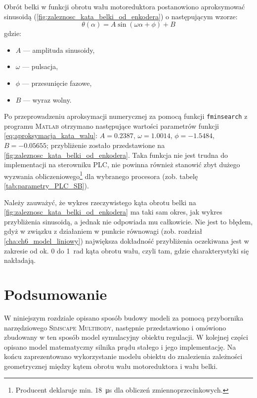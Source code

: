 Obrót belki w funkcji obrotu wału motoreduktora postanowiono aproksymować sinusoidą (\cref{fig:zaleznosc_kata_belki_od_enkodera}) o następującym wzorze:
\begin{equation}\label{eq:aproksymacja_kata_walu}
    \theta(\alpha) = A \sin (\omega \alpha + \phi) + B
\end{equation}
gdzie:
\begin{itemize}
    \item $A$ --- amplituda sinusoidy,
    \item $\omega$ --- pulsacja,
    \item $\phi$ --- przesunięcie fazowe,
    \item $B$ --- wyraz wolny.
\end{itemize}

Po przeprowadzeniu aproksymacji numerycznej za pomocą funkcji \texttt{fminsearch} z programu \textsc{Mat\-lab} otrzymano następujące wartości parametrów funkcji \eqref{eq:aproksymacja_kata_walu}: $A = \num{0.2387}$, $\omega = \num{1.0014}$, $\phi = \num{-1.5484}$, $B = \num{-0.05655}$; przybliżenie zostało przedstawione na \cref{fig:zaleznosc_kata_belki_od_enkodera}. Taka funkcja nie jest trudna do implementacji na sterowniku PLC, nie powinna również stanowić zbyt dużego wyzwania obliczeniowego\footnote{Producent deklaruje min. \SI{18}{\micro\second} dla obliczeń zmiennoprzecinkowych.} dla wybranego procesora (zob. tabelę \ref{tab:parametry_PLC_SB}).

Należy zauważyć, że wykres rzeczywistego kąta obrotu belki na \cref{fig:zaleznosc_kata_belki_od_enkodera} ma taki sam okres, jak wykres przybliżenia sinusoidą, a jednak nie odpowiada mu całkowicie. Nie jest to błędem, gdyż w związku z działaniem w punkcie równowagi (zob. rozdział \ref{cha:ch6_model_liniowy}) największa dokładność przybliżenia oczekiwana jest w zakresie od ok. \num{0} do \SI{1}{\radian} kąta obrotu wału, czyli tam, gdzie charakterystyki się nakładają.

\section{Podsumowanie}

W niniejszym rozdziale opisano sposób budowy modeli za pomocą przybornika narzędziowego \textsc{Simscape Multibody}, następnie przedstawiono i omówiono zbudowany w ten sposób model symulacyjny obiektu regulacji. W kolejnej części opisano model matematyczny silnika prądu stałego i jego implementację. Na końcu zaprezentowano wykorzystanie modelu obiektu do znalezienia zależności geometrycznej między kątem obrotu wału motoreduktora i wału belki.

